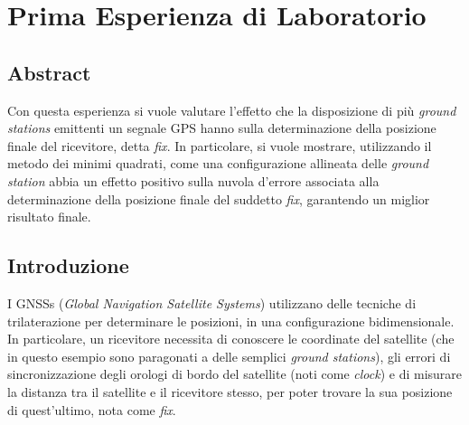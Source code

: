 \documentclass[a4paper,11pt,twoside]{book}
\begin{document}
	\thispagestyle{empty}
	
	\pagestyle{fancy}
	\fancyhead{}
	\renewcommand{\headrulewidth}{0pt}
	\fancyfoot[C]{\thepage}

	\clearpage
	
	\thispagestyle{empty}
	
	\listoffigures
	
	\listoftables
	
	\tableofcontents
	
	\clearpage
	
	\thispagestyle{empty}
	
	\mainmatter
	
	\chapter{Prima Esperienza di Laboratorio}
	
	\pagestyle{fancy}
	\fancyhead[RO,LE]{\thepage}
	\fancyhead[RE]{\leftmark}
	\fancyhead[LO]{\rightmark}
	\renewcommand{\headrulewidth}{0.5pt}
	\fancyfoot{}
	
	\section{Abstract}
	
	Con questa esperienza si vuole valutare l’effetto che la disposizione di più \textit{ground stations} emittenti un segnale GPS hanno sulla determinazione della posizione finale del ricevitore, detta \textit{fix}. In particolare, si vuole mostrare, utilizzando il metodo dei minimi quadrati, come una configurazione allineata delle \textit{ground station} abbia un effetto positivo sulla nuvola d’errore associata alla determinazione della posizione finale del suddetto \textit{fix}, garantendo un miglior risultato finale.
	
	
	\section{Introduzione}
	
	I GNSSs (\textit{Global Navigation Satellite Systems}) utilizzano delle tecniche di trilaterazione per determinare le posizioni, in una configurazione bidimensionale. In particolare, un ricevitore necessita di conoscere le coordinate del satellite (che in questo esempio sono paragonati a delle semplici \textit{ground stations}), gli errori di sincronizzazione degli orologi di bordo del satellite (noti come \textit{clock}) e di misurare la distanza tra il satellite e il ricevitore stesso, per poter trovare la sua posizione di quest'ultimo, nota come \textit{fix}.
		
\end{document}
